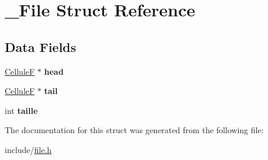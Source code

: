 \hypertarget{struct___file}{\section{\-\_\-\-File Struct Reference}
\label{struct___file}
}
\subsection*{Data Fields}
\begin{DoxyCompactItemize}
\item 
\hypertarget{struct___file_a59fdda667a8aab096d70840554cc8bb6}{\hyperlink{struct___cellule}{Cellule\-F} $\ast$ {\bfseries head}}\label{struct___file_a59fdda667a8aab096d70840554cc8bb6}

\item 
\hypertarget{struct___file_a786106714d1e90aa942b5a72a6fb1bd9}{\hyperlink{struct___cellule}{Cellule\-F} $\ast$ {\bfseries tail}}\label{struct___file_a786106714d1e90aa942b5a72a6fb1bd9}

\item 
\hypertarget{struct___file_a29bf3fc0ffe4e72e45f0c84ab4f8cd1e}{int {\bfseries taille}}\label{struct___file_a29bf3fc0ffe4e72e45f0c84ab4f8cd1e}

\end{DoxyCompactItemize}


The documentation for this struct was generated from the following file\-:\begin{DoxyCompactItemize}
\item 
include/\hyperlink{file_8h}{file.\-h}\end{DoxyCompactItemize}
